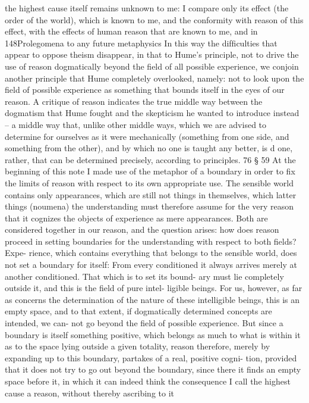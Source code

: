 the highest cause itself remains unknown to me: I compare only its effect (the
order of the world), which is known to me, and the conformity with reason
of this effect, with the effects of human reason that are known to me, and in
148Prolegomena to any future metaphysics
In this way the difﬁculties that appear to oppose theism disappear,
in that to Hume’s principle, not to drive the use of reason dogmatically
beyond the ﬁeld of all possible experience, we conjoin another principle
that Hume completely overlooked, namely: not to look upon the ﬁeld
of possible experience as something that bounds itself in the eyes of our
reason. A critique of reason indicates the true middle way between the
dogmatism that Hume fought and the skepticism he wanted to introduce
instead – a middle way that, unlike other middle ways, which we are
advised to determine for ourselves as it were mechanically (something
from one side, and something from the other), and by which no one
is taught any better, is d one, rather, that can be determined precisely,
according to principles. 76
§ 59
At the beginning of this note I made use of the metaphor of a boundary
in order to ﬁx the limits of reason with respect to its own appropriate
use. The sensible world contains only appearances, which are still not
things in themselves, which latter things (noumena) the understanding
must therefore assume for the very reason that it cognizes the objects of
experience as mere appearances. Both are considered together in our
reason, and the question arises: how does reason proceed in setting
boundaries for the understanding with respect to both ﬁelds? Expe-
rience, which contains everything that belongs to the sensible world,
does not set a boundary for itself: From every conditioned it always
arrives merely at another conditioned. That which is to set its bound-
ary must lie completely outside it, and this is the ﬁeld of pure intel-
ligible beings. For us, however, as far as concerns the determination of
the nature of these intelligible beings, this is an empty space, and to
that extent, if dogmatically determined concepts are intended, we can-
not go beyond the ﬁeld of possible experience. But since a boundary
is itself something positive, which belongs as much to what is within it
as to the space lying outside a given totality, reason therefore, merely
by expanding up to this boundary, partakes of a real, positive cogni-
tion, provided that it does not try to go out beyond the boundary, since
there it ﬁnds an empty space before it, in which it can indeed think the
consequence I call the highest cause a reason, without thereby ascribing to it
